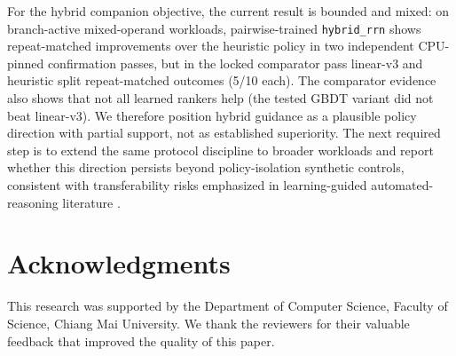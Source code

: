 \documentclass[preprint,12pt,times]{elsarticle}
\begin{document}
For the hybrid companion objective, the current result is bounded and mixed: on branch-active mixed-operand workloads, pairwise-trained \texttt{hybrid\_rrn} shows repeat-matched improvements over the heuristic policy in two independent CPU-pinned confirmation passes, but in the locked comparator pass linear-v3 and heuristic split repeat-matched outcomes (5/10 each). The comparator evidence also shows that not all learned rankers help (the tested GBDT variant did not beat linear-v3). We therefore position hybrid guidance as a plausible policy direction with partial support, not as established superiority. The next required step is to extend the same protocol discipline to broader workloads and report whether this direction persists beyond policy-isolation synthetic controls, consistent with transferability risks emphasized in learning-guided automated-reasoning literature \cite{blaauwbroek2024learningguided,farber2021connectiontableaux}.

\section*{Acknowledgments}
\label{sec:ack}

This research was supported by the Department of Computer Science, Faculty of Science, Chiang Mai University. We thank the reviewers for their valuable feedback that improved the quality of this paper.



\end{document}
